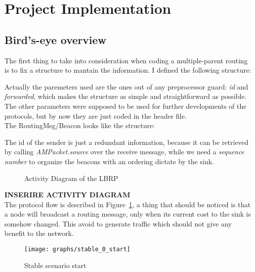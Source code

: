 \documentclass{article}
\begin{document}
\clearpage

\section{Project Implementation}
	\subsection{Bird's-eye overview}
The first thing to take into consideration when coding a multiple-parent routing is to fix a structure to mantain the information. I defined the following structure:

Actually the paremeters used are the ones out of any preprocessor guard: \textit{id} and \textit{forwarded}, which makes the structure as simple and straightforward as possible. The other parameters were supposed to be used for further developments of the protocols, but by now they are just coded in the header file.
\\The RoutingMsg/Beacon looks like the structure:

The id of the sender is just a redundant information, because it can be retrieved by calling \textit{AMPacket.source} over the receive message, while we need a \textit{sequence number} to organize the beacons with an ordering dictate by the sink.
		\begin{figure}[H]
			\caption{Activity Diagram of the LBRP}
			\label{fig:activityLBRP}
		\end{figure}
\textbf{INSERIRE ACTIVITY DIAGRAM}
\\The protocol flow is described in Figure~\ref{fig:activityLBRP}, a thing that should be noticed is that a node will broadcast a routing message, only when its current cost to the sink is somehow changed. This avoid to generate traffic which should not give any benefit to the network.
		\begin{figure}[H]
			\begin{center}
				\texttt{[image: graphs/stable\_0\_start]}
				\caption{Stable scenario start}
				\label{fig:stableStart}
			\end{center}
		\end{figure}
\end{document}
